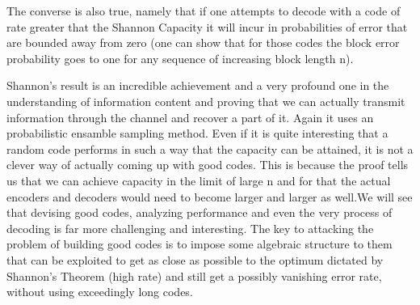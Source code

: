 The converse is also true, namely that if one attempts to decode with a code of rate greater that the Shannon Capacity it will incur in probabilities of error that are bounded away from zero (one can show that for those codes the block error probability goes to one for any sequence of increasing block length n).

\begin{info} %
	 Shannon's result is an incredible achievement and a very profound one in the understanding of information content and proving that we can actually transmit information through the channel and recover a part of it. Again it uses an probabilistic ensamble sampling method. Even if it is quite interesting that a random code performs in such a way that the capacity can be attained, it is not a clever way of actually coming up with good codes. This is because the proof tells us that we can achieve capacity in the limit of large n and for that the actual encoders and decoders would need to become larger and larger as well.We will see that devising good codes, analyzing performance and even the very process of decoding is far more challenging and interesting. The key to attacking the problem of building good codes is to impose some algebraic structure to them that can be exploited to get as close as possible to the optimum dictated by Shannon's Theorem (high rate) and still get a possibly vanishing error rate, without using exceedingly long codes.
\end{info}





